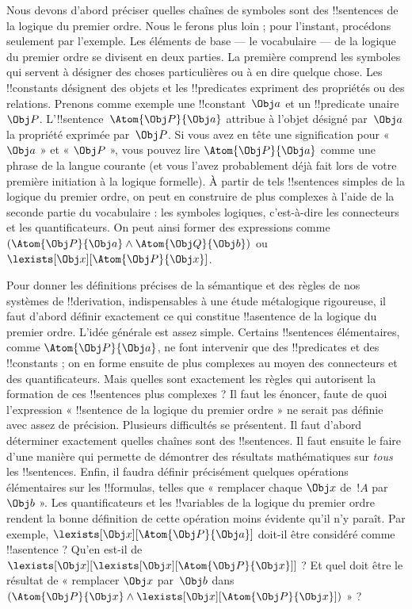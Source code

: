 \documentclass[../../../include/open-logic-section]{subfiles}
\begin{document}


Nous devons d'abord préciser quelles chaînes de symboles sont des
!!{sentence}s de la logique du premier ordre. Nous le ferons plus loin ;
pour l'instant, procédons seulement par l'exemple. Les éléments de
base --- le vocabulaire --- de la logique du premier ordre se divisent
en deux parties. La première comprend les symboles qui servent à
désigner des choses particulières ou à en dire quelque chose. Les
!!{constant}s désignent des objets et les !!{predicate}s expriment
des propriétés ou des relations. Prenons comme exemple une
!!{constant}~$\Obj a$ et un !!{predicate} unaire~$\Obj P$.
L'!!{sentence}~$\Atom{\Obj P}{\Obj a}$ attribue à l'objet désigné
par~$\Obj a$ la propriété exprimée par~$\Obj P$. Si vous avez en tête une
signification pour « $\Obj a$ » et « $\Obj P$ », vous pouvez lire
$\Atom{\Obj P}{\Obj a}$ comme une phrase de la langue courante (et vous
l'avez probablement déjà fait lors de votre première initiation à la
logique formelle). À partir de tels !!{sentence}s simples de la logique
du premier ordre, on peut en construire de plus complexes à l'aide de
la seconde partie du vocabulaire : les symboles logiques, c'est-à-dire
les connecteurs et les quantificateurs. On peut ainsi former des
expressions comme $(\Atom{\Obj P}{\Obj a} \land
\Atom{\Obj Q}{\Obj b})$ ou~$\lexists[\Obj x][\Atom{\Obj P}{\Obj x}]$.

Pour donner les définitions précises de la sémantique et des règles de
nos systèmes de !!{derivation}, indispensables à une étude métalogique
rigoureuse, il faut d'abord définir exactement ce qui constitue
!!a{sentence} de la logique du premier ordre. L'idée générale est assez
simple. Certains !!{sentence}s élémentaires, comme
$\Atom{\Obj P}{\Obj a}$, ne font intervenir que des !!{predicate}s et
des !!{constant}s ; on en forme ensuite de plus complexes au moyen des
connecteurs et des quantificateurs. Mais quelles sont exactement les
règles qui autorisent la formation de ces !!{sentence}s plus
complexes ? Il faut les énoncer, faute de quoi l'expression
« !!{sentence} de la logique du premier ordre » ne serait pas définie
avec assez de précision. Plusieurs difficultés se présentent. Il faut
d'abord déterminer exactement quelles chaînes sont des !!{sentence}s. Il
faut ensuite le faire d'une manière qui permette de démontrer des
résultats mathématiques sur \emph{tous} les !!{sentence}s. Enfin, il
faudra définir précisément quelques opérations élémentaires sur les
!!{formula}s, telles que « remplacer chaque $\Obj x$ de~$!A$
par~$\Obj b$ ». Les quantificateurs et les !!{variable}s de la logique
du premier ordre rendent la bonne définition de cette opération moins
évidente qu'il n'y paraît. Par exemple,
$\lexists[\Obj x][\Atom{\Obj P}{\Obj a}]$ doit-il être considéré comme
!!a{sentence} ? Qu'en est-il de
$\lexists[\Obj x][\lexists[\Obj x][\Atom{\Obj P}{\Obj x}]]$ ? Et quel
doit être le résultat de « remplacer $\Obj x$ par~$\Obj b$ dans
$(\Atom{\Obj P}{\Obj x} \land
\lexists[\Obj x][\Atom{\Obj P}{\Obj x}])$ » ?
\end{document}
